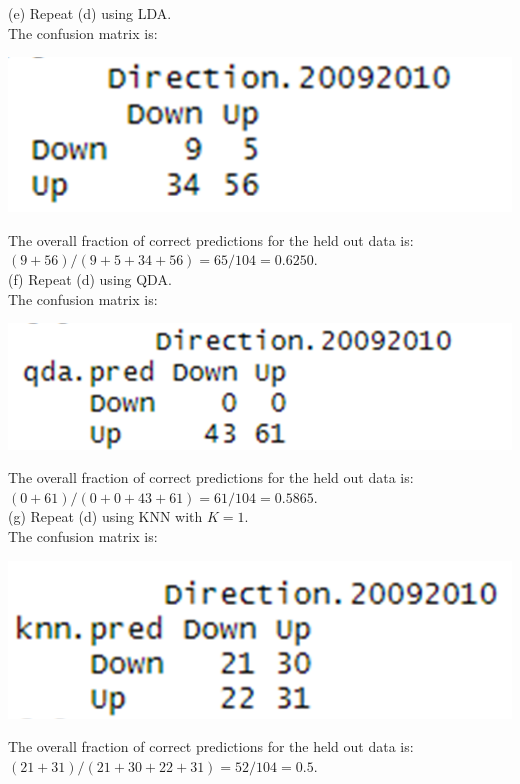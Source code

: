 \documentclass{article}
\begin{document}
\linebreak (e) Repeat (d) using LDA. \\
The confusion matrix is: 
\begin{center}
\includegraphics[scale = 0.46]{2.13.e.png} \\
\end{center}
The overall fraction of correct predictions for the held out data is: $(9 + 56)/(9 + 5 + 34 + 56) = 65/104 = 0.6250$. \\
\linebreak (f) Repeat (d) using QDA. \\
The confusion matrix is: 
\begin{center}
\includegraphics[scale = 0.46]{2.13.f.png} \\
\end{center}
The overall fraction of correct predictions for the held out data is: $(0 + 61)/(0 + 0 + 43 + 61) = 61/104 = 0.5865$. \\
\linebreak (g) Repeat (d) using KNN with $K = 1$. \\
The confusion matrix is: 
\begin{center}
\includegraphics[scale = 0.46]{2.13.g.png} \\
\end{center}
The overall fraction of correct predictions for the held out data is: $(21 + 31)/(21 + 30 + 22 + 31) = 52/104 = 0.5$. \\
\end{document}
